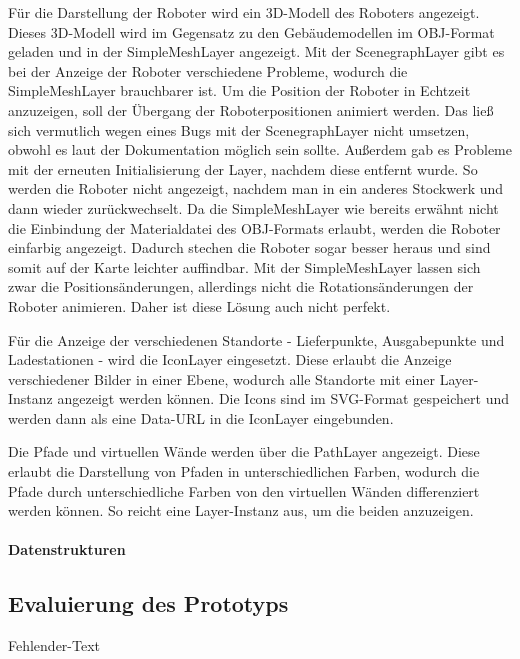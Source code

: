 Für die Darstellung der Roboter wird ein 3D-Modell des Roboters angezeigt. Dieses 3D-Modell wird im Gegensatz zu den Gebäudemodellen im \ac{OBJ}-Format geladen und in der SimpleMeshLayer angezeigt. Mit der ScenegraphLayer gibt es bei der Anzeige der Roboter verschiedene Probleme, wodurch die SimpleMeshLayer brauchbarer ist. Um die Position der Roboter in Echtzeit anzuzeigen, soll der Übergang der Roboterpositionen animiert werden. Das ließ sich vermutlich wegen eines Bugs mit der ScenegraphLayer nicht umsetzen, obwohl es laut der Dokumentation möglich sein sollte. Außerdem gab es Probleme mit der erneuten Initialisierung der Layer, nachdem diese entfernt wurde. So werden die Roboter nicht angezeigt, nachdem man in ein anderes Stockwerk und dann wieder zurückwechselt. Da die SimpleMeshLayer wie bereits erwähnt nicht die Einbindung der Materialdatei des \ac{OBJ}-Formats erlaubt, werden die Roboter einfarbig angezeigt. Dadurch stechen die Roboter sogar besser heraus und sind somit auf der Karte leichter auffindbar. Mit der SimpleMeshLayer lassen sich zwar die Positionsänderungen, allerdings nicht die Rotationsänderungen der Roboter animieren. Daher ist diese Lösung auch nicht perfekt.

Für die Anzeige der verschiedenen Standorte - Lieferpunkte, Ausgabepunkte und Ladestationen - wird die IconLayer eingesetzt. Diese erlaubt die Anzeige verschiedener Bilder in einer Ebene, wodurch alle Standorte mit einer Layer-Instanz angezeigt werden können. 
Die Icons sind im \ac{SVG}-Format gespeichert und werden dann als eine Data-URL in die IconLayer eingebunden.

Die Pfade und virtuellen Wände werden über die PathLayer angezeigt. Diese erlaubt die Darstellung von Pfaden in unterschiedlichen Farben, wodurch die Pfade durch unterschiedliche Farben von den virtuellen Wänden differenziert werden können.
So reicht eine Layer-Instanz aus, um die beiden anzuzeigen.

\paragraph{Datenstrukturen}



\newpage
\subsection{Evaluierung des Prototyps}
Fehlender-Text
